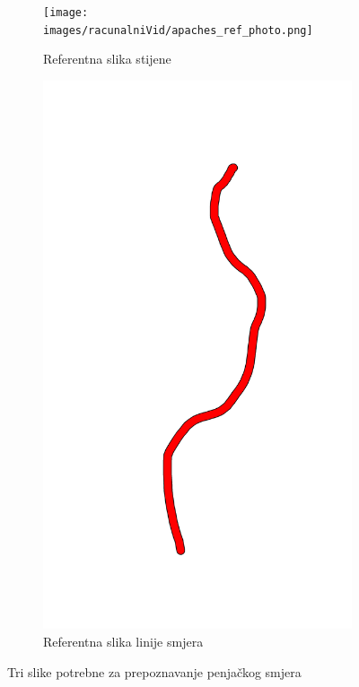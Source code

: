 \begin{figure}[H]
\begin{subfigure}[b]{0.32\textwidth}
        \centering
        \texttt{[image: images/racunalniVid/apaches\_ref\_photo.png]}
        \caption{Referentna slika stijene}
        \label{fig:referentna_slika_linije}
    \end{subfigure}
    \hfill
    \begin{subfigure}[b]{0.32\textwidth}
        \centering
        \includegraphics[width=\textwidth]{images/racunalniVid/apaches_line.png}
        \caption{Referentna slika linije smjera}
        \label{fig:slika_stijene_kamera}
    \end{subfigure}
    \caption{Tri slike potrebne za prepoznavanje penjačkog smjera}
    \label{fig:tri_kljucne_slike}
\end{figure}

